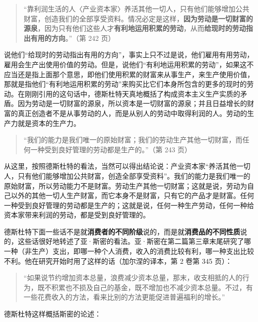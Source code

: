 \begin{quote}“靠利润生活的人〈产业资本家〉养活其他一切人，只有他们能够增加公共财富，创造我们的全部享受资料。情况必定是这样，\textbf{因为劳动是一切财富的源泉}，因为只有他们这些人才\textbf{有利地运用积累的劳动}，从而\textbf{给现时的劳动指出有用的方向}。”（第 242 页）\end{quote}

说他们“给现时的劳动指出有用的方向”，事实上只不过是说，他们雇用有用劳动，雇用会生产出使用价值的劳动。但是，说他们“有利地运用积累的劳动”，如果这不应当还是指上面那个意思，即他们使用积累的财富来从事生产，来生产使用价值，那就是指他们“有利地运用积累的劳动”来购买比它们本身所包含的更多的现时的劳动。在刚刚引用的这句话中，德斯杜特天真地概括了构成资本主义生产实质的矛盾。因为劳动是一切财富的源泉，所以资本是一切财富的源泉；并且日益增长的财富的真正创造者不是从事劳动的人，而是从别人的劳动中取得利润的人。劳动的生产力就是资本的生产力。

\begin{quote}“我们的能力是我们唯一的原始财富；我们的劳动生产其他一切财富，而任何一种受到良好管理的劳动都是生产的。”（第 243 页）\end{quote}

从这里，按照德斯杜特的看法，当然可以得出结论说：产业资本家“养活其他一切人，只有他们能够增加公共财富，创造全部享受资料”。我们的能力是我们唯一的原始财富，所以劳动能力不是财富。劳动生产其他一切财富；这就是说，劳动为自己以外的其他一切人生产财富，而它本身不是财富，只有它的产品才是财富。任何一种受到良好管理的劳动都是生产的；这就是说，任何一种生产劳动，任何一种给资本家带来利润的劳动，都是受到良好管理的。

德斯杜特下面一些话不是就\textbf{消费者的不同阶级}说的，而是就\textbf{消费品的不同性质}说的，这些话很好地转述了亚·斯密的看法。亚·斯密在第二篇第三章末尾研究了哪一种（非生产）支出，即哪一种个人消费，收入的消费比较有利，哪一种支出比较不利。他在研究开始时用了这样的话（加尔涅的译本，第 2 卷第 345 页）：

\begin{quote}“如果说节约增加资本总量，浪费减少资本总量，那末，收支相抵的人的行为，既不积累也不损及自己的基金，既不增加也不减少资本总量。不过，有一些花费收入的方法，看来比别的方法更能促进普遍福利的增长。”\end{quote}

德斯杜特这样概括斯密的论述：

